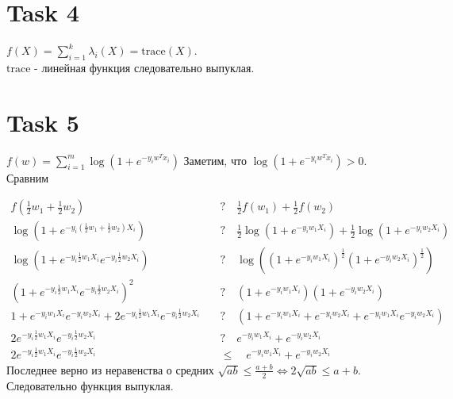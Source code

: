 \documentclass[12pt]{exam}
\begin{document}
\section*{Task 4}
$f(X) = \sum_{i=1}^k \lambda_i(X) = \mathrm{trace}(X)$.\\
$\mathrm{trace}$ - линейная функция следовательно выпуклая.

\section*{Task 5}
$f(w) = \sum_{i=1}^m \log (1 + e^{-y_i w^T x_i})$
Заметим, что $\log (1 + e^{-y_i w^T x_i}) > 0$. \\
Сравним 

\begin{align*}
f(\frac{1}{2} w_1 + \frac{1}{2} w_2) \quad &? \quad 
\frac{1}{2}f(w_1) + \frac{1}{2}f(w_2) \\
\log (1 + e^{-y_i (\frac{1}{2} w_1 + \frac{1}{2} w_2) X_i}) \quad &? \quad 
\frac{1}{2}\log(1 + e^{-y_i w_1 X_i}) + \frac{1}{2} \log(1 + e^{-y_i w_2 X_i}) \\
\log (1 + e^{-y_i \frac{1}{2} w_1 X_i}  e^{-y_i \frac{1}{2} w_2 X_i}) \quad &? \quad 
\log((1 + e^{-y_i w_1 X_i})^\frac{1}{2} (1 + e^{-y_i w_2 X_i})^\frac{1}{2}) \\
(1 + e^{-y_i \frac{1}{2} w_1 X_i}  e^{-y_i \frac{1}{2} w_2 X_i})^2 \quad &? \quad 
(1 + e^{-y_i w_1 X_i}) (1 + e^{-y_i w_2 X_i}) \\
1 + e^{-y_i w_1 X_i}  e^{-y_i w_2 X_i} + 2 e^{-y_i \frac{1}{2} w_1 X_i}  e^{-y_i \frac{1}{2} w_2 X_i} \quad &? \quad 
(1 + e^{-y_i w_1 X_i} + e^{-y_i w_2 X_i} + e^{-y_i w_1 X_i}  e^{-y_i w_2 X_i}) \\
2 e^{-y_i \frac{1}{2} w_1 X_i}  e^{-y_i \frac{1}{2} w_2 X_i} \quad &? \quad 
e^{-y_i w_1 X_i} + e^{-y_i w_2 X_i} \\
2 e^{-y_i \frac{1}{2} w_1 X_i}  e^{-y_i \frac{1}{2} w_2 X_i} \quad &\leq \quad 
e^{-y_i w_1 X_i} + e^{-y_i w_2 X_i}
\end{align*}
Последнее верно из неравенства о средних 
$\sqrt{ab} \leq \frac{a + b}{2} \Leftrightarrow 2\sqrt{ab} \leq a + b$.\\
Следовательно функция выпуклая.
\end{document}
